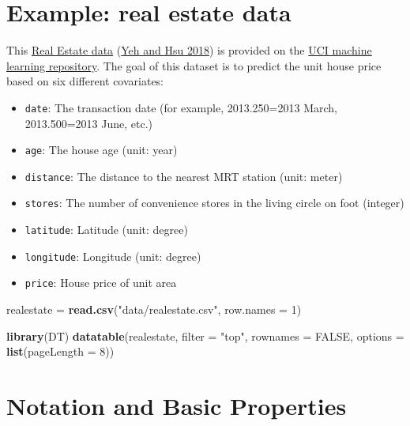 \documentclass[
]{book}
\newenvironment{Shaded}{\begin{snugshade}}{\end{snugshade}}
\newcommand{\AttributeTok}[1]{\textcolor[rgb]{0.13,0.29,0.53}{#1}}
\newcommand{\ConstantTok}[1]{\textcolor[rgb]{0.56,0.35,0.01}{#1}}
\newcommand{\DecValTok}[1]{\textcolor[rgb]{0.00,0.00,0.81}{#1}}
\newcommand{\FunctionTok}[1]{\textcolor[rgb]{0.13,0.29,0.53}{\textbf{#1}}}
\newcommand{\NormalTok}[1]{#1}
\newcommand{\OtherTok}[1]{\textcolor[rgb]{0.56,0.35,0.01}{#1}}
\newcommand{\StringTok}[1]{\textcolor[rgb]{0.31,0.60,0.02}{#1}}
\providecommand{\tightlist}{%
  \setlength{\itemsep}{0pt}\setlength{\parskip}{0pt}}
\theoremstyle{definition}
\theoremstyle{definition}
\theoremstyle{definition}
\theoremstyle{definition}
\theoremstyle{remark}
\begin{document}
\hypertarget{example-real-estate-data}{%
\section{Example: real estate data}\label{example-real-estate-data}}

This \href{https://archive.ics.uci.edu/ml/datasets/Real+estate+valuation+data+set}{Real Estate data} (\protect\hyperlink{ref-yeh2018building}{Yeh and Hsu 2018}) is provided on the \href{https://archive.ics.uci.edu/ml/index.php}{UCI machine learning repository}. The goal of this dataset is to predict the unit house price based on six different covariates:

\begin{itemize}
\tightlist
\item
  \texttt{date}: The transaction date (for example, 2013.250=2013 March, 2013.500=2013 June, etc.)
\item
  \texttt{age}: The house age (unit: year)
\item
  \texttt{distance}: The distance to the nearest MRT station (unit: meter)
\item
  \texttt{stores}: The number of convenience stores in the living circle on foot (integer)
\item
  \texttt{latitude}: Latitude (unit: degree)
\item
  \texttt{longitude}: Longitude (unit: degree)
\item
  \texttt{price}: House price of unit area
\end{itemize}

\begin{Shaded}
\begin{Highlighting}[]
\NormalTok{    realestate }\OtherTok{=} \FunctionTok{read.csv}\NormalTok{(}\StringTok{"data/realestate.csv"}\NormalTok{, }\AttributeTok{row.names =} \DecValTok{1}\NormalTok{)}

    \FunctionTok{library}\NormalTok{(DT)}
    \FunctionTok{datatable}\NormalTok{(realestate, }\AttributeTok{filter =} \StringTok{"top"}\NormalTok{, }\AttributeTok{rownames =} \ConstantTok{FALSE}\NormalTok{,}
              \AttributeTok{options =} \FunctionTok{list}\NormalTok{(}\AttributeTok{pageLength =} \DecValTok{8}\NormalTok{))}
\end{Highlighting}
\end{Shaded}

\hypertarget{notation-and-basic-properties}{%
\section{Notation and Basic Properties}\label{notation-and-basic-properties}}
\end{document}
